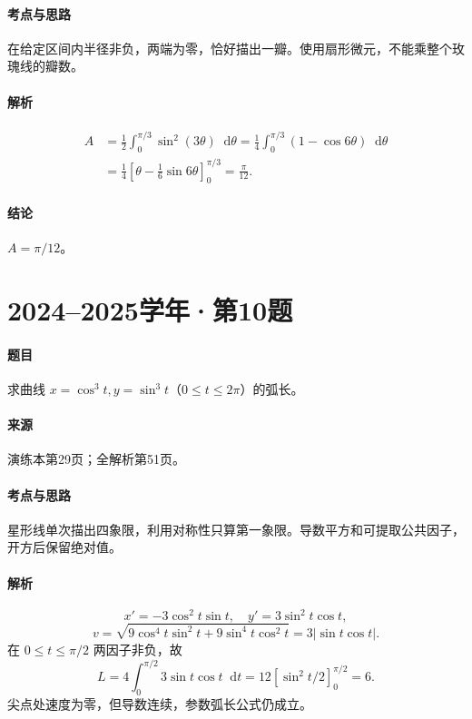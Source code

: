 \documentclass[UTF8,fontset=fandol,12pt,oneside,openany]{ctexrep}
\newcommand{\dd}{\mathop{}\!\mathrm d}
\theoremstyle{definition}
\begin{document}
\paragraph{考点与思路}在给定区间内半径非负，两端为零，恰好描出一瓣。使用扇形微元，不能乘整个玫瑰线的瓣数。
\paragraph{解析}
\begin{align*}
 A&=\frac12\int_0^{\pi/3}\sin^2(3\theta)\dd\theta
 =\frac14\int_0^{\pi/3}(1-\cos6\theta)\dd\theta\\
 &=\frac14\left[\theta-\frac16\sin6\theta\right]_0^{\pi/3}
 =\frac\pi{12}.
\end{align*}
\paragraph{结论}$A=\pi/12$。

\par\addvspace{18pt}\noindent\begin{minipage}{\linewidth}
\section{2024--2025学年·第10题}
\paragraph{题目}求曲线 $x=\cos^3t,y=\sin^3t$（$0\le t\le2\pi$）的弧长。
\paragraph{来源}演练本第29页；全解析第51页。
\end{minipage}\par
\paragraph{考点与思路}星形线单次描出四象限，利用对称性只算第一象限。导数平方和可提取公共因子，开方后保留绝对值。
\paragraph{解析}
\[
 x'=-3\cos^2t\sin t,\quad y'=3\sin^2t\cos t,
\]
\[
 v=\sqrt{9\cos^4t\sin^2t+9\sin^4t\cos^2t}
 =3|\sin t\cos t|.
\]
在 $0\le t\le\pi/2$ 两因子非负，故
\[
 L=4\int_0^{\pi/2}3\sin t\cos t\dd t
 =12[\sin^2t/2]_0^{\pi/2}=6.
\]
尖点处速度为零，但导数连续，参数弧长公式仍成立。
\end{document}
